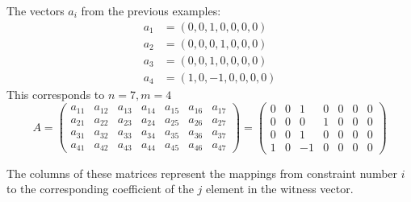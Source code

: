 \documentclass[../lecture-notes.tex]{subfiles}
\begin{document}
\begin{example}
    The vectors $a_i$ from the previous examples:
    \begin{align*}
        a_1 &= (0, 0, 1, 0, 0, 0, 0) \\
        a_2 &= (0, 0, 0, 1, 0, 0, 0) \\
        a_3 &= (0, 0, 1, 0, 0, 0, 0) \\
        a_4 &= (1, 0, -1, 0, 0, 0, 0)
    \end{align*}
    This corresponds to $n = 7, m = 4$
    \begin{equation*}
        A = \begin{pmatrix}
            a_{11} & a_{12} & a_{13} & a_{14} & a_{15} & a_{16} & a_{17} \\
            a_{21} & a_{22} & a_{23} & a_{24} & a_{25} & a_{26} & a_{27} \\
            a_{31} & a_{32} & a_{33} & a_{34} & a_{35} & a_{36} & a_{37} \\
            a_{41} & a_{42} & a_{43} & a_{44} & a_{45} & a_{46} & a_{47}
        \end{pmatrix} = \begin{pmatrix}
            0 & 0 & 1 & 0 & 0 & 0 & 0 \\
            0 & 0 & 0 & 1 & 0 & 0 & 0 \\
            0 & 0 & 1 & 0 & 0 & 0 & 0 \\
            1 & 0 & -1 & 0 & 0 & 0 & 0 
        \end{pmatrix}
    \end{equation*}
\end{example}

The columns of these matrices represent the mappings from constraint number $i$ to the corresponding
coefficient of the $j$ element in the witness vector.
\end{document}
